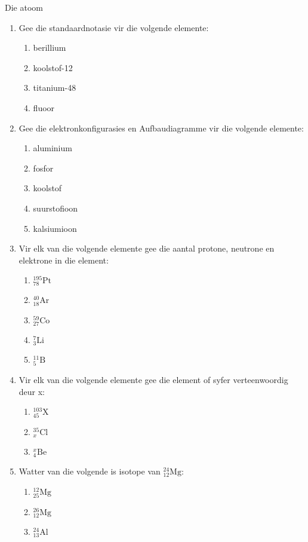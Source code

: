\begin{eocexercises}{Die atoom}
\begin{enumerate}[noitemsep, label=\textbf{\arabic*}. ]
        \item Gee die standaardnotasie vir die volgende elemente:
\begin{enumerate}[noitemsep, label=\textbf{\alph*}. ] 
 \item berillium
\item koolstof-12
\item titanium-48
\item fluoor
\end{enumerate}
\item Gee die elektronkonfigurasies en Aufbaudiagramme vir die volgende elemente:
\begin{enumerate}[noitemsep, label=\textbf{\alph*}. ] 
            \item aluminium
\item fosfor
\item koolstof
\item suurstofioon
\item kalsiumioon
\end{enumerate}
\item Vir elk van die volgende elemente gee die aantal protone, neutrone en elektrone in die element: 
\begin{enumerate}[noitemsep, label=\textbf{\alph*}. ] 
\item $_{78}^{195}\text{Pt}$
\item $_{18}^{40}\text{Ar}$
\item $_{27}^{59}\text{Co}$
\item $_{3}^{7}\text{Li}$
\item $_{5}^{11}\text{B}$
\end{enumerate}
\item Vir elk van die volgende elemente gee die element of syfer verteenwoordig deur x: \begin{enumerate}[noitemsep, label=\textbf{\alph*}. ] 
            \item $_{45}^{103}\text{X}$
\item $_{x}^{35}\text{Cl}$
\item $_{4}^{x}\text{Be}$
\end{enumerate}
\item Watter van die volgende is isotope van $_{12}^{24}\text{Mg}$:
\begin{enumerate}[noitemsep, label=\textbf{\alph*}. ] 
            \item $_{25}^{12}\text{Mg}$
\item $_{12}^{26}\text{Mg}$
\item $_{13}^{24}\text{Al}$
\end{enumerate}

\end{enumerate}
\end{eocexercises}
